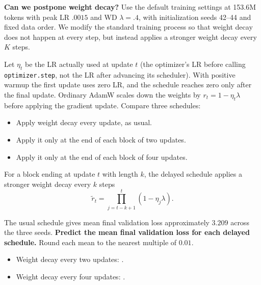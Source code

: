 \clearpage
\begin{examplequestion}[difficulty=medium]
\label{ex:a2-wd-timing}
\textbf{Can we postpone weight decay?}
Use the default training settings at 153.6M tokens with peak LR $.0015$ and WD $\lambda=.4$, with initialization seeds 42--44 and fixed data order. We modify the standard training process so that weight decay does not happen at every step, but instead applies a stronger weight decay every $K$ steps.

Let $\eta_t$ be the LR actually used at update $t$ (the optimizer's LR
before calling \texttt{optimizer.step}, not the LR after advancing its scheduler).
With positive warmup the first update uses zero LR, and the schedule reaches
zero only after the final update. Ordinary AdamW scales down the weights by $r_t=1-\eta_t\lambda$ before applying
the gradient update. Compare three schedules:
\begin{itemize}
\item Apply weight decay every update, as usual.
\item Apply it only at the end of each block of two updates.
\item Apply it only at the end of each block of four updates.
\end{itemize}
For a block ending at update $t$ with length $k$, the delayed schedule applies a stronger weight decay every $k$ steps
\[
 \widetilde r_t=\prod_{j=t-k+1}^{t}(1-\eta_j\lambda).
\]

The usual schedule gives mean final validation loss approximately $3.209$
across the three seeds.
\textbf{Predict the mean final validation loss for each delayed schedule.}
Round each mean to the nearest multiple of $0.01$.
\begin{itemize}
\item Weight decay every two updates: \underline{\hspace{2cm}}.
\item Weight decay every four updates: \underline{\hspace{2cm}}.
\end{itemize}
\end{examplequestion}

